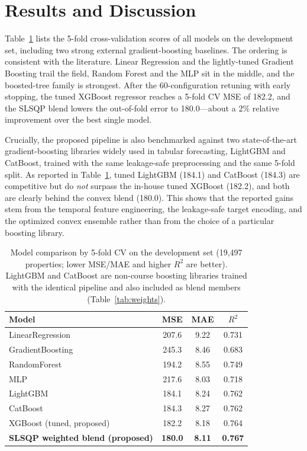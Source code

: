 \documentclass[journal]{IEEEtran}
\begin{document}
\section{Results and Discussion}
\label{sec:results}
Table~\ref{tab:cv} lists the 5-fold cross-validation scores of all models on the
development set, including two strong external gradient-boosting baselines. The
ordering is consistent with the literature. Linear Regression and the
lightly-tuned Gradient Boosting trail the field, Random Forest and the MLP sit in
the middle, and the boosted-tree family is strongest. After the 60-configuration
retuning with early stopping, the tuned XGBoost regressor reaches a 5-fold CV MSE
of 182.2, and the SLSQP blend lowers the out-of-fold error to 180.0---about a
$2\%$ relative improvement over the best single model.

Crucially, the proposed pipeline is also benchmarked against two
state-of-the-art gradient-boosting libraries widely used in tabular forecasting,
LightGBM and CatBoost, trained with the same leakage-safe preprocessing and the
same 5-fold split. As reported in Table~\ref{tab:cv}, tuned LightGBM (184.1) and
CatBoost (184.3) are competitive but do \emph{not} surpass the in-house tuned
XGBoost (182.2), and both are clearly behind the convex blend (180.0). This
shows that the reported gains stem from the temporal feature engineering, the
leakage-safe target encoding, and the optimized convex ensemble rather than from
the choice of a particular boosting library.

\begin{table}[!t]
\caption{Model comparison by 5-fold CV on the development set (19{,}497
properties; lower MSE/MAE and higher $R^2$ are better). LightGBM and CatBoost
are non-course boosting libraries trained with the identical pipeline and also
included as blend members (Table~\ref{tab:weights}).}
\label{tab:cv}
\centering
\begin{tabular}{lccc}
\toprule
Model & MSE & MAE & $R^2$ \\
\midrule
LinearRegression & 207.6 & 9.22 & 0.731 \\
GradientBoosting & 245.3 & 8.46 & 0.683 \\
RandomForest & 194.2 & 8.55 & 0.749 \\
MLP & 217.6 & 8.03 & 0.718 \\
\midrule
LightGBM & 184.1 & 8.24 & 0.762 \\
CatBoost & 184.3 & 8.27 & 0.762 \\
XGBoost (tuned, proposed) & 182.2 & 8.18 & 0.764 \\
\textbf{SLSQP weighted blend (proposed)} & \textbf{180.0} & \textbf{8.11} & \textbf{0.767} \\
\bottomrule
\end{tabular}
\end{table}
\end{document}
